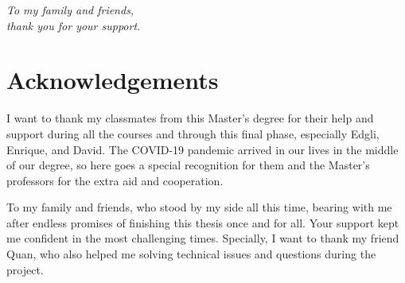 \documentclass[a4paper, 12pt]{book}
\begin{document}
\begin{flushright}
\textit{To my family and friends, \\
thank you for your support.}
\end{flushright}




\chapter*{Acknowledgements}




I want to thank my classmates from this Master's degree for their help and support during all the courses and through this final phase, especially Edgli, Enrique, and David. The COVID-19 pandemic arrived in our lives in the middle of our degree, so here goes a special recognition for them and the Master's professors for the extra aid and cooperation.

To my family and friends, who stood by my side all this time, bearing with me after endless promises of finishing this thesis once and for all. Your support kept me confident in the most challenging times. Specially, I want to thank my friend Quan, who also helped me solving technical issues and questions during the project.
\end{document}
